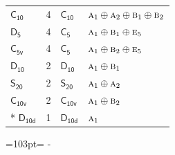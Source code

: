 \documentclass[10pt,a4paper]{article}
\newcommand{\needspace}[1]{\par\penalty-100\begingroup\dimen0=#1\relax\dimen2=\pagegoal
  \advance\dimen2-\pagetotal\ifdim\dimen0>\dimen2\relax\ifdim\dimen2>0pt\vfil\break\fi\fi
  \endgroup}
\numberwithin{equation}{section}
\newcommand{\grp}[1]{\mathsf{#1}}
\newcommand{\irr}[1]{\text{\normalfont\scshape #1}}
\newlength{\fillwidth}\newlength{\cellwidth}\newlength{\colwidth}
\begin{document}
{\begin{longtable}{@{}lrl>{\RaggedRight\arraybackslash}p{\fillwidth}@{}}
\href{C10.pdf}{$\grp{C_{10}}$} & 4 & \href{C10.pdf}{$\grp{C_{10}}$} & $\irr{a}_{1}\oplus \irr{a}_{2}\oplus \irr{b}_{1}\oplus \irr{b}_{2}$\\
\href{D5.pdf}{$\grp{D_{5}}$} & 4 & \href{C5.pdf}{$\grp{C_{5}}$} & $\irr{a}_{1}\oplus \irr{b}_{1}\oplus \irr{e}_{5}$\\
\href{C5v.pdf}{$\grp{C_{5v}}$} & 4 & \href{C5.pdf}{$\grp{C_{5}}$} & $\irr{a}_{1}\oplus \irr{b}_{2}\oplus \irr{e}_{5}$\\
\href{D10.pdf}{$\grp{D_{10}}$} & 2 & \href{D10.pdf}{$\grp{D_{10}}$} & $\irr{a}_{1}\oplus \irr{b}_{1}$\\
\href{S20.pdf}{$\grp{S_{20}}$} & 2 & \href{S20.pdf}{$\grp{S_{20}}$} & $\irr{a}_{1}\oplus \irr{a}_{2}$\\
\href{C10v.pdf}{$\grp{C_{10v}}$} & 2 & \href{C10v.pdf}{$\grp{C_{10v}}$} & $\irr{a}_{1}\oplus \irr{b}_{2}$\\*
\href{D10d.pdf}{$\grp{D_{10d}}$} & 1 & \href{D10d.pdf}{$\grp{D_{10d}}$} & $\irr{a}_{1}$\\
\bottomrule\end{longtable}}
\needspace{103pt}
\end{document}
